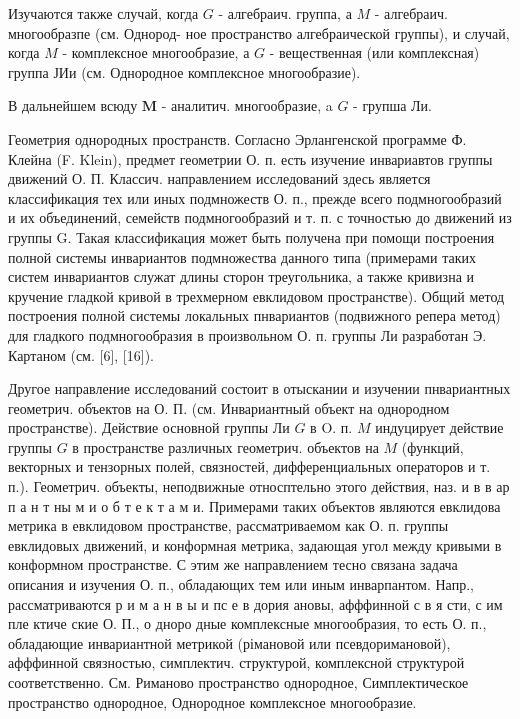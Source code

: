 \documentclass[10pt]{article}
\begin{document}
Изучаются также случай, когда $G$ - алгебраич. группа, а $M$ - алгебраич. многообразпе (см. Однород- ное пространство алгебраической группы), и случай, когда $M$ - комплексное многообразие, а $G$ - вещественная (или комплексная) группа ЈИи (см. Однородное комплексное многообразие).



В дальнейшем всюду $\boldsymbol{M}$ - аналитич. многообразие, a $G$ - групша Ли.



Геометрия однородных пространств. Согласно Эрлангенской программе Ф. Клейна (F. Klein), предмет геометрии О. п. есть изучение инвариавтов группы движений О. П. Классич. направлением исследований здесь является классификация тех или иных подмножеств О. п., прежде всего подмногообразий и их объединений, семейств подмногообразий и т. п. с точностью до движений из группы G. Такая классификация может быть получена при помощи построения полной системы инвариантов подмножества данного типа (примерами таких систем инвариантов служат длины сторон треугольника, а также кривизна и кручение гладкой кривой в трехмерном евклидовом пространстве). Общий метод построения полной системы локальных пнвариантов (подвижного репера метод) для гладкого подмногообразия в произвольном О. п. группы Ли разработан Э. Картаном (см. [6], [16]).



Другое направление исследований состоит в отыскании и изучении пнвариантных геометрич. объектов на О. П. (см. Инвариантный объект на однородном пространстве). Действие основной группы Ли $G$ в O. п. $M$ индуцирует действие группы $G$ в пространстве различных геометрич. объектов на $M$ (функций, векторных и тензорных полей, связностей, дифференциальных операторов и т. п.). Геометрич. объекты, неподвижные относптельно этого действия, наз. и в в ар п а н т ны м и о б т е к т а м и. Примерами таких объектов являются евклидова метрика в евклидовом пространстве, рассматриваемом как О. п. группы евклидовых движений, и конформная метрика, задающая угол между кривыми в конформном пространстве. С этим же направлением тесно связана задача описания и изучения О. п., обладающих тем или иным инварпантом. Напр., рассматриваются р и м а н в ы и пс е в дория ановы, афффинной с в я сти, с им пле ктиче ские О. П., о дноро дные комплексные многообразия, то есть О. п., обладающие инвариантной метрикой (рімановой или псевдоримановой), афффинной связностью, симплектич. структурой, комплексной структурой соответственно. См. Риманово пространство однородное, Симплектическое пространство однородное, Однородное комплексное многообразие.
\end{document}
